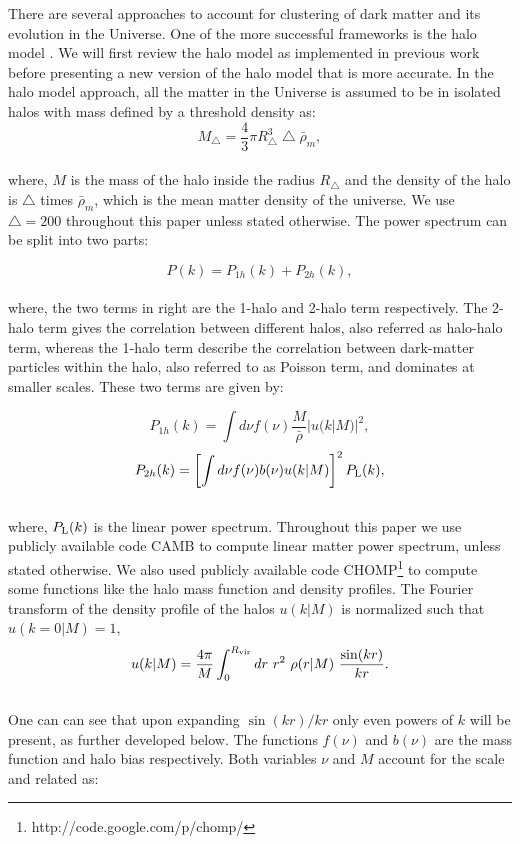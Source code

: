 \documentclass[
  11pt,
  twoside,
  openright,
  titlepage,
  headings=optiontoheadandtoc
]{scrbook}
\begin{document}
There are several approaches to account for clustering of dark matter and its evolution in the Universe. One of the 
more successful frameworks is the halo model \citep{1977ApJ...217..331M,2000MNRAS.318..203S,2000ApJ...543..503M,2000MNRAS.318.1144P,2002PhR...372....1C}. 
We will first review the halo model as implemented in previous work before presenting a new version of the halo model
that is more accurate. 
In the halo model approach, all the matter in the Universe is assumed to be in isolated halos with mass
defined by a threshold density as:
\begin{equation}
	M_{\bigtriangleup} = \dfrac{4}{3} \pi R^3_{\bigtriangleup} \bigtriangleup \bar{\rho}_m,
\end{equation}
\\
where, $M$ is the mass of the halo inside the radius $R_{\bigtriangleup}$ and the density of the halo is $\bigtriangleup$ times $\bar{\rho}_m$, which is the mean matter density of the universe. We use $\bigtriangleup=200$ throughout this paper unless stated otherwise. The power spectrum can be split into two parts:

\begin{equation}
	P(k) = P_{1h}(k) + P_{2h}(k),
\end{equation}
\\
where, the two terms in right are the 1-halo and 2-halo term respectively. The 2-halo term gives the correlation between different halos, also referred as halo-halo term, whereas the 1-halo term describe the correlation between dark-matter particles within the halo, also referred to as Poisson term, and dominates at smaller scales. These two terms are given by:

\begin{equation}
	P_{1h}(k) = \int d\nu f(\nu) \dfrac{M}{\bar{\rho}} |u(k|M)|^2, 
	\label{p2:eqn:pk1h}
\end{equation}
\begin{equation}
	P_{2h}(k) = \left[ \int d\nu f(\nu) b(\nu) u(k|M) \right]^2 P_{\rm L}(k),
\end{equation}
\\
where, $P_{\rm L}(k)$ is the linear power spectrum. 
Throughout this paper we use publicly available code CAMB \citep{Lewis:1999bs} to compute linear matter power spectrum, unless stated otherwise. 
We also used publicly available code CHOMP\footnote{ http://code.google.com/p/chomp/} to compute some functions like the halo 
mass function and density profiles. 
The Fourier transform of the density profile of the halos $u(k|M)$ is normalized such that $u(k=0|M)=1$,
\begin{equation}
	u(k|M) = \dfrac{4 \pi}{M} \int_0^{R_{\rm vir}}dr\  r^2\  \rho(r|M)\ \dfrac{\sin(kr)}{kr}.
\end{equation}
\\
One can can see that upon expanding $\sin(kr)/kr$ only even powers of $k$ will be present, as further developed below. 
The functions $f(\nu)$ and $b(\nu)$ are the mass function and halo bias respectively. Both variables $\nu$ and $M$ account for the scale and related as:
\end{document}
